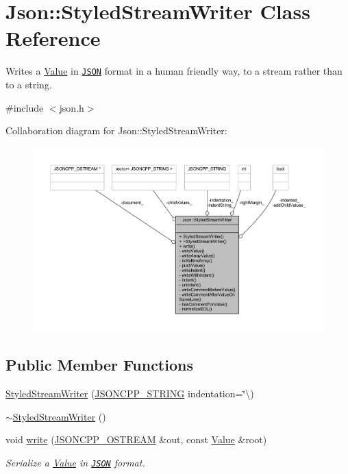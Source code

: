 \hypertarget{class_json_1_1_styled_stream_writer}{}\section{Json\+:\+:Styled\+Stream\+Writer Class Reference}
\label{class_json_1_1_styled_stream_writer}


Writes a \hyperlink{class_json_1_1_value}{Value} in \href{http://www.json.org}{\tt J\+S\+ON} format in a human friendly way, to a stream rather than to a string.  




{\ttfamily \#include $<$json.\+h$>$}



Collaboration diagram for Json\+:\+:Styled\+Stream\+Writer\+:\nopagebreak
\begin{figure}[H]
\begin{center}
\leavevmode
\includegraphics[width=350pt]{class_json_1_1_styled_stream_writer__coll__graph}
\end{center}
\end{figure}
\subsection*{Public Member Functions}
\begin{DoxyCompactItemize}
\item 
\hyperlink{class_json_1_1_styled_stream_writer_a5e41c4e40f11266046bd0ea8f8f5a75e}{Styled\+Stream\+Writer} (\hyperlink{json_8h_a1e723f95759de062585bc4a8fd3fa4be}{J\+S\+O\+N\+C\+P\+P\+\_\+\+S\+T\+R\+I\+NG} indentation=\char`\"{}\textbackslash{})
\item 
\hyperlink{class_json_1_1_styled_stream_writer_a17444a59f617970279714e97b0ddfa46}{$\sim$\+Styled\+Stream\+Writer} ()
\item 
void \hyperlink{class_json_1_1_styled_stream_writer_a5d89d984fe675641e42c4370cd247774}{write} (\hyperlink{json_8h_a37a25be5fca174927780caeb280094ce}{J\+S\+O\+N\+C\+P\+P\+\_\+\+O\+S\+T\+R\+E\+AM} \&out, const \hyperlink{class_json_1_1_value}{Value} \&root)
\begin{DoxyCompactList}\small\item\em Serialize a \hyperlink{class_json_1_1_value}{Value} in \href{http://www.json.org}{\tt J\+S\+ON} format. \end{DoxyCompactList}\end{DoxyCompactItemize}
